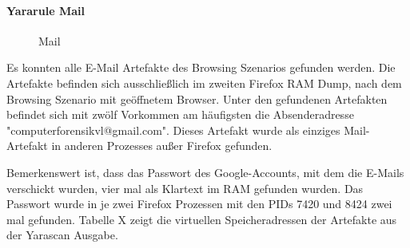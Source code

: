 \paragraph*{Yararule Mail}
\begin{figure}[h!]
	\centerline{}
	\label{chart:final-criteria}  
	\caption{Mail}
\end{figure}
Es konnten alle E-Mail Artefakte des Browsing Szenarios gefunden werden.
Die Artefakte befinden sich ausschließlich im zweiten Firefox RAM Dump, nach dem Browsing Szenario mit geöffnetem Browser.
Unter den gefundenen Artefakten befindet sich mit zwölf Vorkommen am häufigsten die Absenderadresse "computerforensikvl@gmail.com". Dieses Artefakt wurde als einziges Mail-Artefakt in anderen Prozesses außer Firefox gefunden.

Bemerkenswert ist, dass das Passwort des Google-Accounts, mit dem die E-Mails verschickt wurden, vier mal als Klartext im RAM gefunden wurden. Das Passwort wurde in je zwei Firefox Prozessen mit den PIDs 7420 und 8424 zwei mal gefunden. Tabelle X zeigt die virtuellen Speicheradressen der Artefakte aus der Yarascan Ausgabe.
\begin{table}[]
\end{table}

